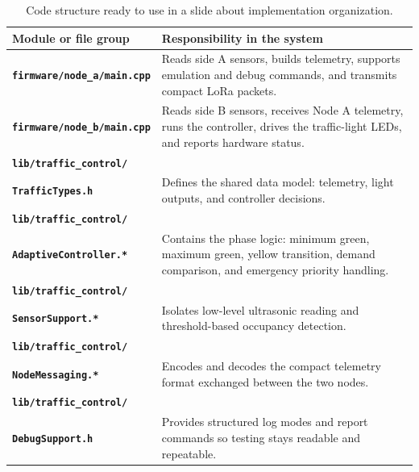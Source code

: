 \documentclass[11pt,a4paper]{article}
\begin{document}
\begin{table}[h!]
\centering
\footnotesize
\renewcommand{\arraystretch}{1.08}
\begin{tabularx}{\textwidth}{>{\bfseries}p{} Y}
\toprule
Module or file group & Responsibility in the system \\
\midrule
\texttt{firmware/node\_a/main.cpp} & Reads side A sensors, builds telemetry, supports emulation and debug commands, and transmits compact LoRa packets. \\
\texttt{firmware/node\_b/main.cpp} & Reads side B sensors, receives Node A telemetry, runs the controller, drives the traffic-light LEDs, and reports hardware status. \\
\texttt{lib/traffic\_control/}\\\texttt{TrafficTypes.h} & Defines the shared data model: telemetry, light outputs, and controller decisions. \\
\texttt{lib/traffic\_control/}\\\texttt{AdaptiveController.*} & Contains the phase logic: minimum green, maximum green, yellow transition, demand comparison, and emergency priority handling. \\
\texttt{lib/traffic\_control/}\\\texttt{SensorSupport.*} & Isolates low-level ultrasonic reading and threshold-based occupancy detection. \\
\texttt{lib/traffic\_control/}\\\texttt{NodeMessaging.*} & Encodes and decodes the compact telemetry format exchanged between the two nodes. \\
\texttt{lib/traffic\_control/}\\\texttt{DebugSupport.h} & Provides structured log modes and report commands so testing stays readable and repeatable. \\
\bottomrule
\end{tabularx}
\caption{Code structure ready to use in a slide about implementation organization.}
\end{table}
\end{document}
